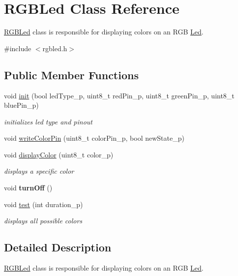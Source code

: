 \hypertarget{class_r_g_b_led}{}\section{R\+G\+B\+Led Class Reference}
\label{class_r_g_b_led}


\hyperlink{class_r_g_b_led}{R\+G\+B\+Led} class is responsible for displaying colors on an R\+GB \hyperlink{class_led}{Led}.  




{\ttfamily \#include $<$rgbled.\+h$>$}

\subsection*{Public Member Functions}
\begin{DoxyCompactItemize}
\item 
void \hyperlink{class_r_g_b_led_aa12ca52b63da78e35b6bbec3624df991}{init} (bool led\+Type\+\_\+p, uint8\+\_\+t red\+Pin\+\_\+p, uint8\+\_\+t green\+Pin\+\_\+p, uint8\+\_\+t blue\+Pin\+\_\+p)
\begin{DoxyCompactList}\small\item\em initializes led type and pinout \end{DoxyCompactList}\item 
void \hyperlink{class_r_g_b_led_a9ab9701eb0f4d945fd9ca6e2235d7ee9}{write\+Color\+Pin} (uint8\+\_\+t color\+Pin\+\_\+p, bool new\+State\+\_\+p)
\item 
void \hyperlink{class_r_g_b_led_a6a1e12a1f48fc29acd30aa88a1cfd1b1}{display\+Color} (uint8\+\_\+t color\+\_\+p)
\begin{DoxyCompactList}\small\item\em displays a specific color \end{DoxyCompactList}\item 
\mbox{\label{class_r_g_b_led_af00b4e0ef8ec0aea4452fc2133b03453}} 
void {\bfseries turn\+Off} ()
\item 
void \hyperlink{class_r_g_b_led_ab5c88bff636d49c1eaa34e75f6b4e380}{test} (int duration\+\_\+p)
\begin{DoxyCompactList}\small\item\em displays all possible colors \end{DoxyCompactList}\end{DoxyCompactItemize}


\subsection{Detailed Description}
\hyperlink{class_r_g_b_led}{R\+G\+B\+Led} class is responsible for displaying colors on an R\+GB \hyperlink{class_led}{Led}. 

